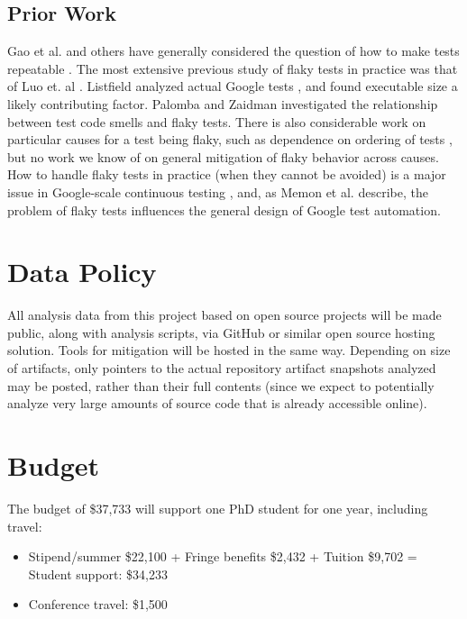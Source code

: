 \documentclass[10pt]{article}
\begin{document}
\subsection{Prior Work}


Gao et al. and others have generally considered the question of how to make tests repeatable \cite{Gao:2015:MSU:2818754.2818764}.  
The most extensive previous study of flaky tests in practice was that of Luo et. al \cite{luo2014empirical}.  Listfield analyzed actual Google tests \cite{listfieldtestanalysis}, and found executable size a likely contributing factor. Palomba and Zaidman \cite{palomba2017does} investigated the relationship between test code smells and flaky tests.  There is also considerable work on particular causes for a test being flaky, such as dependence on ordering of tests \cite{LamZE2015}, but no work we know of on general mitigation of flaky behavior across causes.  How to handle flaky tests in practice (when they cannot be avoided) is a major issue in Google-scale continuous testing \cite{memon2017taming}, and, as Memon et al. describe, the problem of flaky tests influences the general design of Google test automation.




\section{Data Policy}

All analysis data from this project based on open source projects will be made public, along with analysis scripts, via GitHub or similar open source hosting solution.  Tools for mitigation will be hosted in the same way.  Depending on size of artifacts, only pointers to the actual repository artifact snapshots analyzed may be posted, rather than their full contents (since we expect to potentially analyze very large amounts of source code that is already accessible online).

\section{Budget}

The budget of \$37,733 will support one PhD student for one year, including travel:

{
\begin{itemize}
\item Stipend/summer \$22,100 + Fringe benefits \$2,432 + Tuition \$9,702 = Student support: \$34,233
\item Conference travel: \$1,500
\end{itemize}
}
\end{document}
